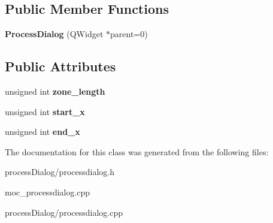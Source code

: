 \subsection*{Public Member Functions}
\begin{DoxyCompactItemize}
\item 
\hypertarget{class_process_dialog_a31e3e8798a5a9d16aa872c242c69ed82}{
{\bfseries ProcessDialog} (QWidget $\ast$parent=0)}
\label{class_process_dialog_a31e3e8798a5a9d16aa872c242c69ed82}

\end{DoxyCompactItemize}
\subsection*{Public Attributes}
\begin{DoxyCompactItemize}
\item 
\hypertarget{class_process_dialog_a157948d87442246dfd31f96e13964748}{
unsigned int {\bfseries zone\_\-length}}
\label{class_process_dialog_a157948d87442246dfd31f96e13964748}

\item 
\hypertarget{class_process_dialog_ac84aa88919bdd961f4590526e5249749}{
unsigned int {\bfseries start\_\-x}}
\label{class_process_dialog_ac84aa88919bdd961f4590526e5249749}

\item 
\hypertarget{class_process_dialog_a63d291adedc8c165137d50cc7a91af30}{
unsigned int {\bfseries end\_\-x}}
\label{class_process_dialog_a63d291adedc8c165137d50cc7a91af30}

\end{DoxyCompactItemize}


The documentation for this class was generated from the following files:\begin{DoxyCompactItemize}
\item 
processDialog/processdialog.h\item 
moc\_\-processdialog.cpp\item 
processDialog/processdialog.cpp\end{DoxyCompactItemize}
